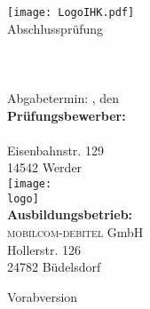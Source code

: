 \thispagestyle{plain}
\begin{titlepage}

\begin{center}
\texttt{[image: LogoIHK.pdf]}\\[1ex]
\Large{Abschlussprüfung \pruefungstermin}\\[3ex]

\Large{\ausbildungsberuf}\\
\LARGE{\betreff}\\[4ex]

\huge{\textbf{\titel}}\\[1.5ex]

\normalsize
Abgabetermin: \ort, den \abgabetermin\\[3em]
\textbf{Prüfungsbewerber:}\\
\autor\\
Eisenbahnstr. 129\\
14542 Werder\\[5ex]

\texttt{[image: \\logo]}\\[2ex]
\textbf{Ausbildungsbetrieb:}\\
\textsc{mobilcom-debitel} GmbH\\
Hollerstr. 126\\
24782 Büdelsdorf\\[5em]
\end{center}

\small
\noindent
Vorabversion
\end{titlepage}